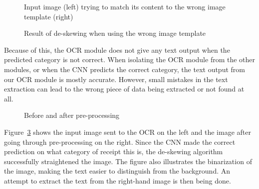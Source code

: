 \begin{figure}[h]
    \caption{Input image (left) trying to match its content to the wrong image template (right)}
    \label{fig:scuffedmatch2}
\end{figure}

\begin{figure}[h]
    \caption{Result of de-skewing when using the wrong image template}
    \label{fig:scuffedmatchresult}
\end{figure}

Because of this, the OCR module does not give any text output when the predicted category is not correct.
When isolating the OCR module from the other modules, or when the CNN predicts the correct category, the text output from our OCR module is mostly accurate.
However, small mistakes in the text extraction can lead to the wrong piece of data being extracted or not found at all.

\begin{figure}[h]
    \caption{Before and after pre-processing}
    \label{fig:beforeaftepreprocess}
\end{figure}


Figure~\ref{fig:beforeaftepreprocess} shows the input image sent to the OCR on the left and the image after going
through pre-processing on the right.
Since the CNN made the correct prediction on what category of receipt this is, the de-skewing algorithm successfully straightened the image.
The figure also illustrates the binarization of the image, making the text easier to distinguish from the background.
An attempt to extract the text from the right-hand image is then being done.

